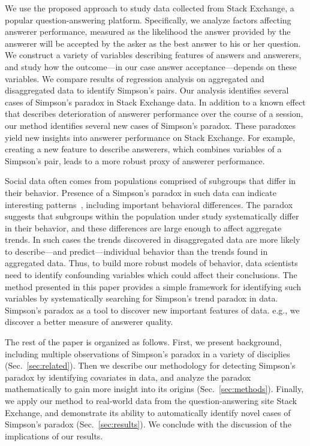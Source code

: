 We use the proposed approach to study data collected from Stack Exchange, a popular question-answering platform. Specifically, we analyze factors affecting answerer performance, measured as the likelihood the answer provided by the answerer will be accepted by the asker as the best answer to his or her question. We construct a variety of variables describing features of answers and answerers, and study how the outcome---in our case answer acceptance---depends on these variables. We compare results of regression analysis on aggregated and disaggregated data to identify Simpson's pairs. Our analysis identifies several cases of Simpson's paradox in Stack Exchange data. In addition to a known effect that describes deterioration of answerer performance over the course of a session, our method identifies several new cases of Simpson's paradox. These paradoxes yield new insights into answerer performance on Stack Exchange. For example, creating a new feature to describe answerers, which combines variables of a Simpson's pair, leads to a more robust proxy of answerer performance.

Social data often comes from populations comprised of subgroups that differ in their behavior. Presence of a Simpson's paradox in such data can indicate interesting patterns~\cite{fabris2000discovering}, including important behavioral differences. The paradox suggests that subgroups within the population under study systematically differ in their behavior, and these differences are large enough to affect aggregate trends. In such cases the trends discovered in disaggregated data are more likely to describe---and predict---individual behavior than the trends found in aggregated data. Thus, to build more robust models of behavior, data scientists need to identify confounding variables which could affect their conclusions. The method presented in this paper provides a simple framework for identifying such variables by systematically searching for Simpson's trend paradox in data.
Simpson's paradox as a tool to discover new important features of data. e.g., we discover a better measure of answerer quality.


The rest of the paper is organized as follows. First, we present background, including multiple observations of Simpson's paradox in a variety of disciplies (Sec.~\ref{sec:related}). Then we describe our methodology for detecting Simpson's paradox by identifying covariates in data, and analyze the paradox mathematically to gain more insight into its origins (Sec.~\ref{sec:methods}). Finally, we apply our method to real-world data from the question-answering site Stack Exchange, and demonstrate its ability to automatically identify novel cases of Simpson's paradox (Sec.~\ref{sec:results}). We conclude with the discussion of the implications of our results.

